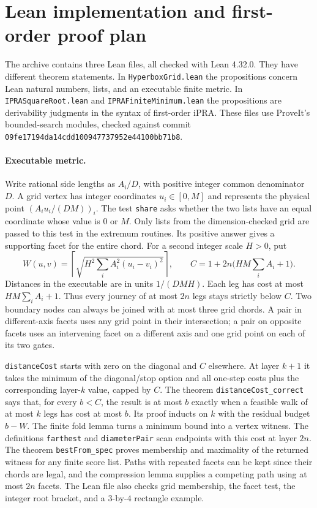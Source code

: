 \documentclass[10pt,letterpaper]{article}
\begin{document}
\section{Lean implementation and first-order proof plan}
\label{sec:lean}
The archive contains three Lean files, all checked with Lean 4.32.0.
They have different theorem statements. In \texttt{HyperboxGrid.lean}
the propositions concern Lean natural numbers, lists, and an executable
finite metric. In \texttt{IPRASquareRoot.lean} and \texttt{IPRAFiniteMinimum.lean} the propositions are
derivability judgments in the syntax of first-order iPRA. These files
use ProveIt's bounded-search modules, checked against
commit \texttt{09fe17194da14cdd100947737952e44100bb71b8}.

\paragraph{Executable metric.}
Write rational side lengths as $A_i/D$, with positive integer common
denominator $D$. A grid vertex has integer coordinates $u_i\in[0,M]$
and represents the physical point $(A_i u_i/(DM))_i$. The test
\texttt{share} asks whether the two lists have an equal coordinate whose
value is $0$ or $M$. Only lists from the dimension-checked grid are
passed to this test in the extremum routines. Its positive answer gives
a supporting facet for the entire chord. For a second integer scale
$H>0$, put
\[
 W(u,v)=\left\lceil\sqrt{H^2\sum_i A_i^2(u_i-v_i)^2}\right\rceil,
 \qquad C=1+2n\bigl(HM\textstyle\sum_i A_i+1\bigr).
\]
Distances in the executable are in units $1/(DMH)$. Each leg has cost at
most $HM\sum_i A_i+1$. Thus every journey of at most $2n$ legs stays
strictly below $C$. Two boundary nodes can always be joined with at most
three grid chords. A pair in different-axis facets uses any grid point
in their intersection; a pair on opposite facets uses an intervening
facet on a different axis and one grid point on each of its two gates.

\texttt{distanceCost} starts with zero on the diagonal and $C$ elsewhere.
At layer $k+1$ it takes the minimum of the diagonal/stop option and all
one-step costs plus the corresponding layer-$k$ value, capped by $C$.
The theorem \texttt{distanceCost\_correct} says that, for every $b<C$,
the result is at most $b$ exactly when a feasible walk of at most
$k$ legs has cost at most $b$. Its proof inducts on $k$ with the
residual budget $b-W$. The finite fold lemma turns a minimum bound into
a vertex witness. The definitions \texttt{farthest} and
\texttt{diameterPair} scan endpoints with this cost at layer $2n$.
The theorem \texttt{bestFrom\_spec} proves membership and maximality of
the returned witness for any finite score list. Paths with repeated
facets can be kept since their chords are legal, and the compression
lemma supplies a competing path using at most $2n$ facets. The Lean
file also checks grid membership, the facet test, the integer root
bracket, and a $3$-by-$4$ rectangle example.
\end{document}
